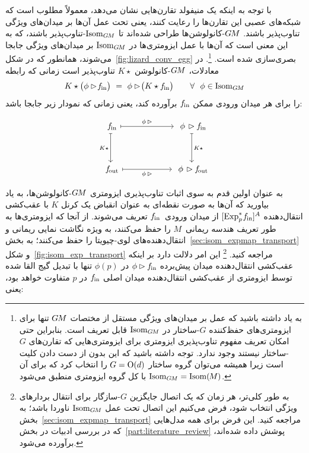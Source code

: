 با توجه به اینکه یک منیفولد تقارن‌هایی نشان می‌دهد، معمولاً مطلوب است که شبکه‌های عصبی این تقارن‌ها را رعایت کنند، یعنی تحت عمل آن‌ها بر میدان‌های ویژگی تناوب‌پذیر باشند.
$G\mkern-1.4muM$-کانولوشن‌ها طراحی شده‌اند تا $\operatorname{Isom}_{G\mkern-1.4muM}$-تناوب‌پذیر باشند، که به این معنی است که آن‌ها با عمل ایزومتری‌ها در $\operatorname{Isom}_{G\mkern-1.4muM}$ بر میدان‌های ویژگی جابجا می‌شوند، همانطور که در شکل~\ref{fig:lizard_conv_egg} بصری‌سازی شده است.%
\footnote{
	به یاد داشته باشید که عمل بر میدان‌های ویژگی مستقل از مختصات $G\mkern-1.4muM$ تنها برای ایزومتری‌های حفظ‌کننده $G$-ساختار در $\operatorname{Isom}_{G\mkern-1.4muM}$ قابل تعریف است.
	بنابراین حتی امکان تعریف مفهوم تناوب‌پذیری ایزومتری برای ایزومتری‌هایی که تقارن‌های $G$-ساختار نیستند وجود ندارد.
	توجه داشته باشید که این بدون از دست دادن کلیت است زیرا همیشه می‌توان گروه ساختار $G=\operatorname{O}(d)$ را انتخاب کرد که برای آن $\operatorname{Isom}_{G\mkern-1.4muM}=\operatorname{Isom}(\mkern-1.5mu M \mkern-.5mu)$ با کل گروه ایزومتری منطبق می‌شود.
}.
در معادلات، $G\mkern-1.4muM$-کانولوشن $K\star$ تناوب‌پذیر است زمانی که رابطه
\begin{align}\label{eq:isometry_equivariance_conv_def_33}
	K \star \big( \phi\rhd\! \fin \big) \ =\ \phi\rhd\! \big( K \star \fin \big)
	\qquad \forall\ \ \phi\in \IsomGM
\end{align}
را برای هر میدان ورودی ممکن $f_\textup{\;\!\!in}$ برآورده کند، یعنی زمانی که نمودار زیر جابجا باشد:

\begin{equation}\label{cd:isometry_equivariance_conv_mapsto}
	\begin{tikzcd}[column sep=60pt, row sep=35, font=\normalsize]
		\fin
		\arrow[r, "\phi\,\rhd", mapsto]
		\arrow[d, "K\star"', mapsto]
		&
		\phi\,\rhd \fin
		\arrow[d, "K\star", mapsto]
		\\
		\fout
		\arrow[r, "\phi\,\rhd"', mapsto]
		&
		\phi\,\rhd \fout
	\end{tikzcd}
\end{equation}


به عنوان اولین قدم به سوی اثبات تناوب‌پذیری ایزومتری $G\mkern-1.4muM$-کانولوشن‌ها، به یاد بیاورید که آن‌ها به صورت نقطه‌ای به عنوان انقباض یک کرنل $K$ با عقب‌کشی انتقال‌دهنده $[\operatorname{Exp}^*_p\mkern-2mu f_\textup{\;\!\!in}]^A$ از میدان ورودی~$f_\textup{\;\!\!in}$ تعریف می‌شوند.
از آنجا که ایزومتری‌ها به طور تعریف هندسه ریمانی~$M$ را حفظ می‌کنند، به ویژه نگاشت نمایی ریمانی و انتقال‌دهنده‌های لوی-چیویتا را حفظ می‌کنند؛ به بخش~\ref{sec:isom_expmap_transport} و شکل~\ref{fig:isom_exp_transport} مراجعه کنید.%
\footnote{
	به طور کلی‌تر، هر زمان که یک اتصال جایگزین $G$-سازگار برای انتقال بردارهای ویژگی انتخاب شود، فرض می‌کنیم این اتصال تحت عمل $\operatorname{Isom}_{G\mkern-1.4muM}$ ناوردا باشد؛ به بخش~\ref{sec:isom_expmap_transport} مراجعه کنید.
	این فرض برای همه مدل‌هایی که در بررسی ادبیات در بخش~\ref{part:literature_review} پوشش داده شده‌اند، برآورده می‌شود.
}
این امر دلالت دارد بر اینکه عقب‌کشی انتقال‌دهنده میدان پیش‌برده $\phi\rhd f_\textup{\;\!\!in}$ در $\phi(p)$ تنها با تبدیل گیج القا شده توسط ایزومتری از عقب‌کشی انتقال‌دهنده میدان اصلی $f_\textup{\;\!\!in}$ در $p$ متفاوت خواهد بود، یعنی:

